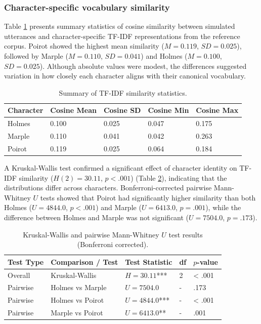 \documentclass{article}
\begin{document}
\subsubsection{Character-specific vocabulary similarity} \label{sec:results_lexical_vocab}

Table \ref{tab:lexical_tfidf} presents summary statistics of cosine similarity between simulated utterances and character-specific TF-IDF representations from the reference corpus. Poirot showed the highest mean similarity ($M=0.119$, $SD=0.025$), followed by Marple ($M=0.110$, $SD=0.041$) and Holmes ($M=0.100$, $SD=0.025$). Although absolute values were modest, the differences suggested variation in how closely each character aligns with their canonical vocabulary.

\begin{table}[H]
\centering
\begin{tabular}{l l l l l}\toprule
Character & Cosine Mean& Cosine SD& Cosine Min & Cosine Max \\\midrule
Holmes & 0.100 & 0.025 & 0.047 & 0.175 \\
Marple & 0.110 & 0.041 & 0.042 & 0.263 \\
Poirot & 0.119 & 0.025 & 0.064 & 0.184 \\ \bottomrule
\end{tabular}
\caption{Summary of TF-IDF similarity statistics.}
\label{tab:lexical_tfidf}
\end{table}

A Kruskal-Wallis test confirmed a significant effect of character identity on TF-IDF similarity ($H(2)=30.11$, $p<.001$) (Table \ref{tab:lexical_stattest}), indicating that the distributions differ across characters. Bonferroni-corrected pairwise Mann-Whitney $U$ tests showed that Poirot had significantly higher similarity than both Holmes ($U=4844.0$, $p<.001$) and Marple ($U=6413.0$, $p=.001$), while the difference between Holmes and Marple was not significant ($U=7504.0$, $p=.173$). 

\begin{table}[H]
\centering
\begin{tabular}{l l l l l}\toprule
Test Type & Comparison / Test & Test Statistic & df & $p$-value \\\midrule
Overall & Kruskal-Wallis & $H=30.11$*** & 2 & < .001 \\
Pairwise & Holmes vs Marple & $U=7504.0$ & - & .173 \\
Pairwise & Holmes vs Poirot & $U=4844.0$*** & - & < .001 \\
Pairwise & Marple vs Poirot & $U=6413.0$** & - & .001 \\ \bottomrule
\end{tabular}
\caption{Kruskal-Wallis and pairwise Mann-Whitney $U$ test results (Bonferroni corrected).}
\label{tab:lexical_stattest}
\end{table}
\end{document}
